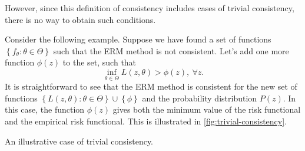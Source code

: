 However, since this definition of consistency includes cases of trivial consistency, there
is no way to obtain such conditions.

Consider the following example.  Suppose we have found a set of functions $\left\{ f_\theta
: \theta \in \Theta \right\}$ such that the ERM method is not consistent.  Let's add
one more function $\phi(z)$ to the set, such that
\begin{equation*}
  \inf_{\theta \in \Theta} L(z, \theta) > \phi(z),~\forall z\text{.}
\end{equation*}
It is straightforward to see that the ERM method is consistent for the new set of
functions $\left\{ L(z, \theta) : \theta \in \Theta \right\} \cup \left\{ \phi \right\}$
and the probability distribution $P(z)$.  In this case, the function $\phi(z)$ gives both
the minimum value of the risk functional and the empirical risk functional.  This is
illustrated in \cref{fig:trivial-consistency}.

\begin{figurebox}[label=fig:trivial-consistency]{An illustrative case of trivial consistency.}
  \centering
\end{figurebox}

